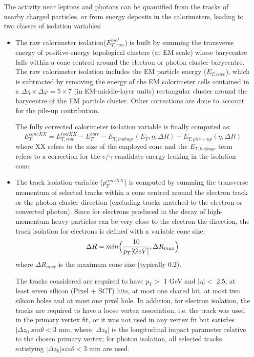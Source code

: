 \documentclass[a4paper, oneside]{book}
\begin{document}
		\cite{El ph reco}The activity near leptons and photons can be quantified from the tracks of nearby charged particles, or from energy deposits in the calorimeters, leading to two classes of isolation variables:
		\begin{itemize}
			\item The raw calorimeter isolation($E_{T,raw}^{isol}$) is built by summing the transverse energy of positive-energy topological clusters (at EM scale) whose barycentre falls within a cone centred around the electron or photon cluster barycentre. The raw calorimeter isolation includes the EM particle energy ($E_{T,core}$), which is subtracted by removing the energy of the EM calorimeter cells contained in a $\Delta\eta \times \Delta\varphi = 5 \times 7$ (in EM-middle-layer units) rectangular
			cluster around the barycentre of the EM particle cluster. Other corrections are done to account for the pile-up contribution. %
			
			The fully corrected calorimeter isolation variable is finally computed as:
			$$ 
			E_{T}^{coneXX} = E_{T,raw}^{isolXX} - E_{T}^{core} - E_{T,leakage}(E_T,\eta,\Delta R) -E_{T,pile-up}(\eta,\Delta R)
			$$
			where XX refers to the size of the employed cone and the $E_{T,leakage}$ term refers to a correction for the $e/\gamma$ candidate energy leaking in the isolation cone.
			\item The track isolation variable ($p_T^{coneXX}$) is computed by summing the transverse momentum of selected tracks within a cone centred around the electron track or the photon cluster direction (excluding tracks matched to the electron or converted photon). \cite{El ph isol} Since for electrons produced in the decay of high-momentum heavy particles can be very close to the electron the direction, the track isolation for electrons is defined with a variable cone size:
			$$
			\Delta R = min\Bigl({\frac{10}{p_T[GeV]},\Delta R_{max}}\Bigr)
			$$
			where $\Delta R_{max}$ is the maximum cone size (typically 0.2).
			
			The tracks considered are required to have $p_T >$ 1 GeV and $|\eta| <$ 2.5, at least seven silicon (Pixel + SCT) hits, at most one shared hit, at most two silicon holes and at most one pixel hole. In addition, for electron isolation, the tracks are required to have a loose vertex association, i.e. the track was used in the primary vertex fit, or it was not used in any vertex fit but satisfies $|\Delta z_0|sin{\theta} < 3$ mm, where $|\Delta z_0|$ is the longitudinal impact parameter relative to the chosen primary vertex; for photon
			isolation, all selected tracks satisfying $|\Delta z_0|sin{\theta} < 3$ mm are used.
		\end{itemize}
		
\end{document}
